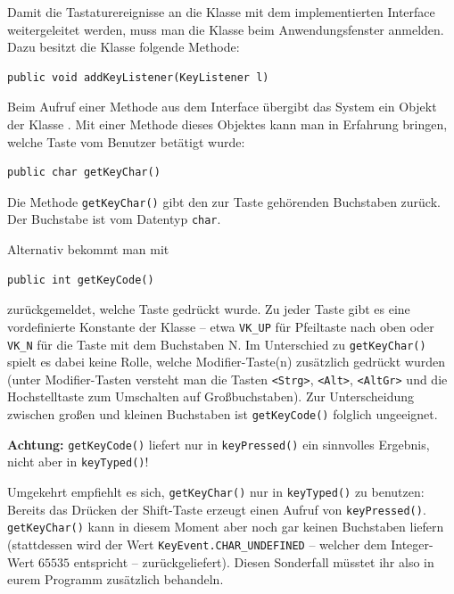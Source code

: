 Damit die Tastaturereignisse an die Klasse mit dem implementierten Interface
weitergeleitet werden, muss man die Klasse beim Anwendungsfenster \glqq anmelden\grqq .
Dazu besitzt die Klasse  folgende Methode:

\begin{lstlisting}
public void addKeyListener(KeyListener l)
\end{lstlisting}

Beim Aufruf einer Methode aus dem Interface  übergibt das
System ein Objekt der Klasse . Mit einer Methode dieses
Objektes kann man in Erfahrung bringen, welche Taste vom Benutzer betätigt
wurde:

\begin{lstlisting}
public char getKeyChar() 
\end{lstlisting}

Die Methode \lstinline|getKeyChar()| gibt den zur Taste gehörenden Buchstaben
zurück. Der Buchstabe ist vom Datentyp \lstinline|char|.

Alternativ bekommt man mit

\begin{lstlisting}
public int getKeyCode() 
\end{lstlisting}

zurückgemeldet, welche Taste gedrückt wurde. Zu jeder Taste gibt es eine
vordefinierte Konstante der Klasse  -- etwa \lstinline|VK_UP|
für Pfeiltaste nach oben oder \lstinline|VK_N| für die Taste mit dem Buchstaben
N. Im Unterschied zu \lstinline|getKeyChar()| spielt es dabei keine Rolle,
welche Modifier-Taste(n) zusätzlich gedrückt wurden (unter Modifier-Tasten
versteht man die Tasten \lstinline|<Strg>|, \lstinline|<Alt>|,
\lstinline|<AltGr>| und die Hochstelltaste zum Umschalten auf Großbuchstaben).
Zur Unterscheidung zwischen großen und kleinen Buchstaben ist
\lstinline|getKeyCode()| folglich ungeeignet.

\textbf{Achtung:} \lstinline|getKeyCode()| liefert nur in \lstinline|keyPressed()|
ein sinnvolles Ergebnis, nicht aber in \lstinline|keyTyped()|! 

Umgekehrt empfiehlt es sich, \lstinline|getKeyChar()| nur in
\lstinline|keyTyped()| zu benutzen: Bereits das Drücken der Shift-Taste erzeugt
einen Aufruf von \lstinline|keyPressed()|. \lstinline|getKeyChar()| kann in
diesem Moment aber noch gar keinen Buchstaben liefern (stattdessen wird der
Wert \lstinline|KeyEvent.CHAR_UNDEFINED| -- welcher dem Integer-Wert $65535$
entspricht -- zurückgeliefert). Diesen Sonderfall müsstet ihr also in eurem
Programm zusätzlich behandeln.

